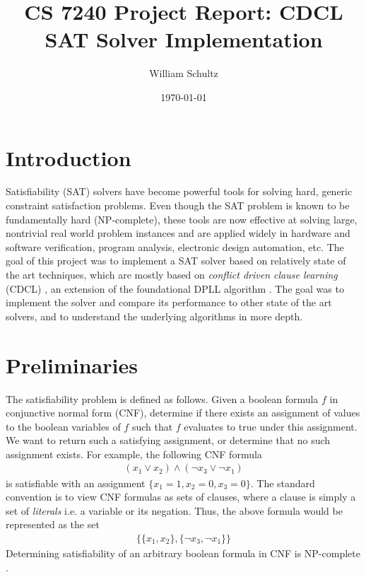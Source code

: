 \documentclass[12pt]{article}
\begin{document}
\title{CS 7240 Project Report: CDCL SAT Solver Implementation}
\author{William Schultz}
\date{\today}

\maketitle

\newcommand{\green}[1]{\textcolor{green}{#1}}
\newcommand{\red}[1]{\textcolor{red}{#1}}

\section{Introduction}

Satisfiability (SAT) solvers have become powerful tools for solving hard, generic constraint satisfaction problems. Even though the SAT problem is known to be fundamentally hard (NP-complete), these tools are now effective at solving large, nontrivial real world problem instances and are applied widely in hardware and software verification, program analysis, electronic design automation, etc. The goal of this project was to implement a SAT solver based on relatively state of the art techniques, which are mostly based on \textit{conflict driven clause learning} (CDCL) \cite{09bieresathandbook, bierecdcl,96sakallah}, an extension of the foundational DPLL algorithm \cite{1960dpll}. The goal was to implement the solver and compare its performance to other state of the art solvers, and to understand the underlying algorithms in more depth.

\section{Preliminaries}

The satisfiability problem is defined as follows. Given a boolean formula $f$ in conjunctive normal form (CNF), determine if there exists an assignment of values to the boolean variables of $f$ such that $f$ evaluates to true under this assignment. We want to return such a satisfying assignment, or determine that no such assignment exists. For example, the following CNF formula
\begin{align*}
    (x_1 \vee x_2) \wedge (\neg x_3 \vee \neg x_1)
\end{align*}
is satisfiable with an assignment $\{x_1=1, x_2=0, x_3=0\}$. The standard convention is to view CNF formulas as sets of clauses, where a clause is simply a set of \textit{literals} i.e. a variable or its negation. Thus, the above formula would be represented as the set
\begin{align*}
    \{\{x_1,x_2\}, \{\neg x_3, \neg x_1\}\}
\end{align*}
Determining satisfiability of an arbitrary boolean formula in CNF is NP-complete \cite{71cook}.
\end{document}
